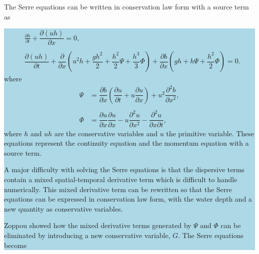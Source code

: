 \documentclass[times]{elsarticle}
\newcommand{\hlb}[1] {\par\colorbox{lightblue}{\parbox{\linewidth}{#1}}}
\newcommand{\hlb}[1] {{#1}}
\begin{document}
The Serre equations can be written in conservation law form with a source term \cite{Zoppou-etal-2017} as
\hlb{
\begin{subequations}
	\begin{align*}
	&\frac{\partial h}{\partial t} + \dfrac{\partial (uh)}{\partial x} = 0,  %
	\\ \nonumber \\
	&\dfrac{\partial (uh)}{\partial t} + \dfrac{\partial}{\partial x} \left ( u^2h + \dfrac{gh^2}{2} + \dfrac{h^2}{2}{\Psi} + \dfrac{h^3}{3}{ \Phi }  \right )  +  \dfrac{\partial b}{\partial x} \left (gh +   h \Psi + \dfrac{h^2}{2}{ \Phi }  \right ) = 0.	%
	\end{align*}
\end{subequations}
where
\begin{subequations}
	\begin{align*}
	{ \Psi }  &= \dfrac{\partial b}{\partial x}\left(\dfrac{\partial u}{\partial t} + u\dfrac{\partial u}{\partial x} \right)  + u^2\dfrac{\partial^2 b}{\partial x^2}, %
	\\ \nonumber \\
	{ \Phi }  &= \dfrac{\partial u }{\partial x} \dfrac{\partial u}{\partial x} -u \dfrac{\partial^2 u}{\partial x^2}  - \dfrac{\partial^2 u}{\partial x \partial t} , %
	\end{align*}
\end{subequations}
where $h$ and $uh$  are the conservative variables and $u$ the primitive variable.  These equations represent the continuity equation and the momentum equation with a source term.

A major difficulty with solving the Serre equations is that the dispersive terms contain a mixed spatial-temporal derivative term which is difficult to handle numerically. This mixed derivative term can be rewritten  so that the Serre equations can be expressed in conservation law form, with the water depth and a new quantity as conservative variables.

Zoppou \cite{Zoppou-etal-2017} showed how the mixed derivative terms generated by $\Psi$ and $\Phi$ can be eliminated by introducing a new conservative variable, $G$. The Serre equations become
}
\end{document}
